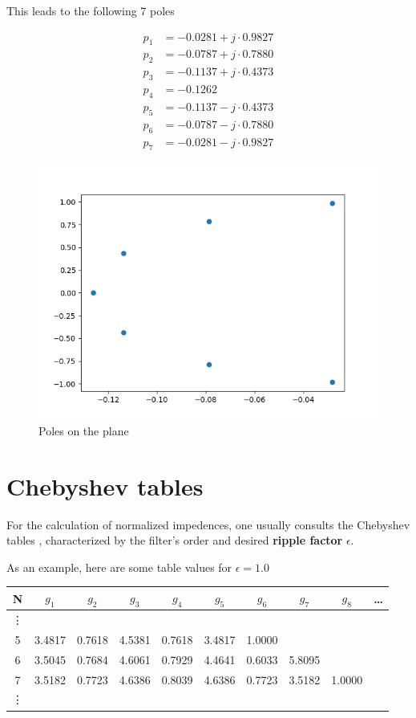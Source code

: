 \documentclass[a4paper,12pt]{report}
\begin{document}
This leads to the following 7 poles 

\begin{align}
	p_1 &= -0.0281 + j \cdot 0.9827 \\
	p_2 &= -0.0787 + j \cdot 0.7880 \\
	p_3 &= -0.1137 + j \cdot 0.4373 \\
	p_4 &= -0.1262				\\
	p_5 &= -0.1137 - j \cdot 0.4373 \\
	p_6 &= -0.0787 - j \cdot 0.7880 \\
	p_7 &= -0.0281 - j \cdot 0.9827
\end{align}

\begin{figure}[!htb]
	\centering
	\includegraphics[width=.5\textwidth]{pictures/n=7_epsilon=1.0.png}
	\caption{\label{lul} \small Poles on the plane}
\end{figure}

\newpage

\section{Chebyshev tables}

For the calculation of normalized impedences, one usually consults the Chebyshev tables \cite{tables}, characterized by the filter's order and desired \textbf{ripple factor} $\epsilon$. 

As an example, here are some table values for $\epsilon=1.0$

\begin{center}
	\begin{tabular}{||c c c c c c c c c c||} 
		\hline
		N & $g_1$  & $g_2$  & $g_3$  & $g_4$  & $g_5$  & $g_6$  & $g_7$  & $g_8$ & \dots \\ [0.5ex] 
		\hline
		\vdots &&&&&&&&&\\
		\hline
		 5  & 3.4817 & 0.7618 & 4.5381 & 0.7618 & 3.4817 & 1.0000 &   &  & \\ 
		\hline
		 6  & 3.5045 & 0.7684 & 4.6061 & 0.7929 & 4.4641 & 0.6033 & 5.8095 &  & \\
		\hline
		7  & 3.5182 & 0.7723 & 4.6386 & 0.8039 & 4.6386 & 0.7723 & 3.5182 & 1.0000 & \\
		\hline 
		\vdots &&&&&&&&&\\
		\hline
	\end{tabular}
\end{center}
\end{document}
